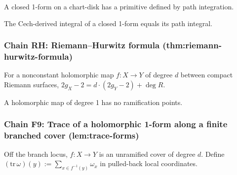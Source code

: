 \begin{lemma}
\label{lem:path-integral-primitive}
A closed 1-form on a chart-disk has a primitive defined by path integration.
\leanok
\end{lemma}

\begin{lemma}
\label{lem:integral-cech-path-equivalence}
The Cech-derived integral of a closed 1-form equals its path integral.
\leanok
\end{lemma}

\subsubsection*{Chain RH: Riemann--Hurwitz formula (thm:riemann-hurwitz-formula)}

\begin{lemma}
\label{thm:riemann-hurwitz-formula}
For a nonconstant holomorphic map $f : X \to Y$ of degree $d$ between compact Riemann surfaces,
$2 g_{X} - 2 = d \cdot (2 g_{Y} - 2) + \deg R$.
\leanok
\end{lemma}

\begin{lemma}
\label{lem:ramification-zero-of-deg-one}
A holomorphic map of degree 1 has no ramification points.
\leanok
\end{lemma}

\subsubsection*{Chain F9: Trace of a holomorphic 1-form along a finite branched cover (lem:trace-forms)}

\begin{lemma}
\label{lem:trf-r1}
Off the branch locus, $f : X \to Y$ is an unramified cover of degree $d$.  Define $(\mathrm{tr}\,\omega)(y) := \sum_{x \in f^{-1}(y)} \omega_{x}$ in pulled-back local coordinates.
\leanok
\end{lemma}

